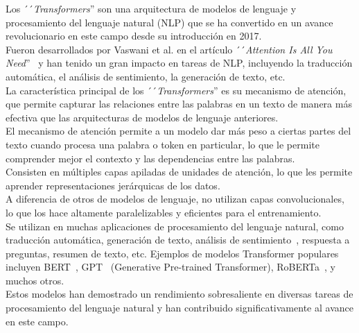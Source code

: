 Los ´´\emph{Transformers}'' son una arquitectura de modelos de lenguaje y procesamiento del lenguaje natural (NLP)
que se ha convertido en un avance revolucionario en este campo desde su introducción en 2017.\\
Fueron desarrollados por Vaswani et al. en el artículo ´´\emph{Attention Is All You Need}''~\cite{vaswani2023attention}
y han tenido un gran impacto en tareas de NLP, incluyendo la traducción automática,
el análisis de sentimiento, la generación de texto, etc.\\
La característica principal de los ´´\emph{Transformers}'' es su mecanismo de atención,
que permite capturar las relaciones entre las palabras en un texto
de manera más efectiva que las arquitecturas de modelos de lenguaje anteriores.\\
El mecanismo de atención permite a un modelo dar más peso a ciertas partes del texto
cuando procesa una palabra o token en particular, lo que le permite comprender
mejor el contexto y las dependencias entre las palabras.\\
Consisten en múltiples capas apiladas de unidades de atención, 
lo que les permite aprender representaciones jerárquicas de los datos.\\
A diferencia de otros de modelos de lenguaje, no utilizan capas convolucionales, 
lo que los hace altamente paralelizables y eficientes para el entrenamiento.\\
Se utilizan en muchas aplicaciones de procesamiento del lenguaje natural, como traducción automática, 
generación de texto, análisis de sentimiento~\cite{UrdanetaTransformers}, 
respuesta a preguntas, resumen de texto, etc.
Ejemplos de modelos Transformer populares incluyen BERT~\cite{devlin2019bert}, 
GPT~\cite{chatgpt1} (Generative Pre-trained Transformer), RoBERTa~\cite{liu2019roberta}, y muchos otros.\\ 
Estos modelos han demostrado un rendimiento sobresaliente en diversas 
tareas de procesamiento del lenguaje natural y han contribuido significativamente 
al avance en este campo.

